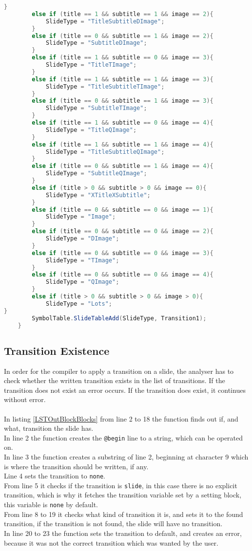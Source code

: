 \begin{lstlisting}[frame=single,caption=Function: OutBlockBlocks, label=LSTOutBlockBlocks, language=java]
		}
		else if (title == 1 && subtitle == 1 && image == 2){
			SlideType = "TitleSubtitleDImage";
		}
		else if (title == 0 && subtitle == 1 && image == 2){
			SlideType = "SubtitleDImage";
		}
		else if (title == 1 && subtitle == 0 && image == 3){
			SlideType = "TitleTImage";
		}
		else if (title == 1 && subtitle == 1 && image == 3){
			SlideType = "TitleSubtitleTImage";
		}
		else if (title == 0 && subtitle == 1 && image == 3){
			SlideType = "SubtitleTImage";
		}
		else if (title == 1 && subtitle == 0 && image == 4){
			SlideType = "TitleQImage";
		}
		else if (title == 1 && subtitle == 1 && image == 4){
			SlideType = "TitleSubtitleQImage";
		}
		else if (title == 0 && subtitle == 1 && image == 4){
			SlideType = "SubtitleQImage";
		}
		else if (title > 0 && subtitle > 0 && image == 0){
			SlideType = "XTitleXSubtitle";
		}
		else if (title == 0 && subtitle == 0 && image == 1){
			SlideType = "Image";
		}
		else if (title == 0 && subtitle == 0 && image == 2){
			SlideType = "DImage";
		}
		else if (title == 0 && subtitle == 0 && image == 3){
			SlideType = "TImage";
		}
		else if (title == 0 && subtitle == 0 && image == 4){
			SlideType = "QImage";
		}
		else if (title > 0 && subtitle > 0 && image > 0){
			SlideType = "Lots";
}
		SymbolTable.SlideTableAdd(SlideType, Transition1);
	}
\end{lstlisting}

\subsection{Transition Existence}

In order for the compiler to apply a transition on a slide, the analyser has to check whether the written transition exists in the list of transitions. If the transition does not exist an error occurs. If the transition does exist, it continues without error.\\ \\
In listing \ref{LSTOutBlockBlocks} from line 2 to 18 the function finds out if, and what, transition the slide has. \\
In line 2 the function creates the \texttt{@begin} line to a string, which can be operated on. \\
In line 3 the function creates a substring of line 2, beginning at character 9 which is where the transition should be written, if any. \\
Line 4 sets the transition to \texttt{none}. \\
From line 5 it checks if the transition is \texttt{slide}, in this case there is no explicit transition, which is why it fetches the transition variable set by a setting block, this variable is \texttt{none} by default. \\
From line 8 to 19 it checks what kind of transition it is, and sets it to the found transition, if the transition is not found, the slide will have no transition. \\
In line 20 to 23 the function sets the transition to default, and creates an error, because it was not the correct transition which was wanted by the user.


